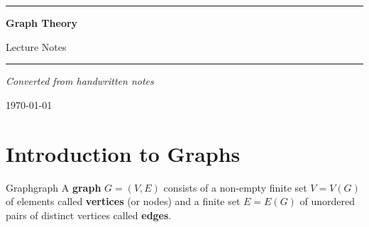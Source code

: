 \documentclass[11pt,a4paper]{scrartcl}
\begin{document}
\begin{titlepage}
\centering
\vspace*{2cm}

{\color{ChapterBlue}\rule{\textwidth}{1.5pt}}
\vspace{0.6cm}

{\fontsize{32}{38}\selectfont\bfseries\color{ChapterBlue} Graph Theory}

\vspace{0.4cm}
{\Large\color{gray} Lecture Notes}

\vspace{0.4cm}
{\color{ChapterBlue}\rule{\textwidth}{1.5pt}}

\vspace{2cm}


\vspace{2cm}

{\large\textit{Converted from handwritten notes}}

\vspace{0.5cm}
{\normalsize\color{gray} \today}

\vfill
\end{titlepage}

\tableofcontents
\newpage


\section{Introduction to Graphs}

\begin{definition}{Graph}{graph}
A \textbf{graph} $G = (V, E)$ consists of a non-empty finite set $V = V(G)$ of elements called \textbf{vertices} (or nodes) and a finite set $E = E(G)$ of unordered pairs of distinct vertices called \textbf{edges}.
\end{definition}
\end{document}

